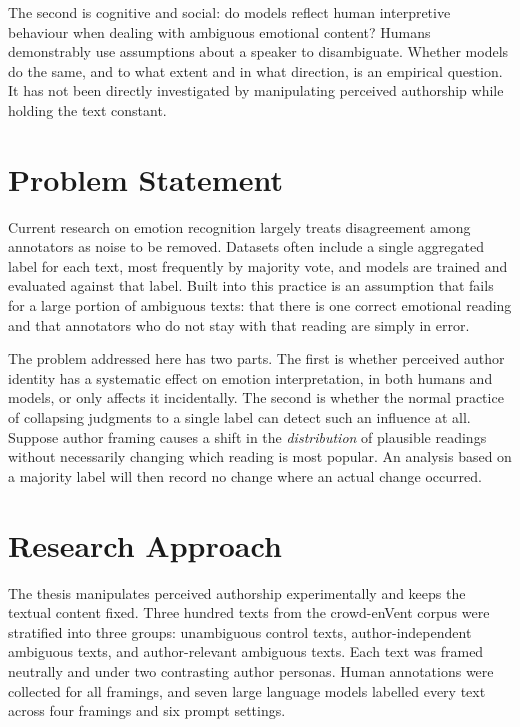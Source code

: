 The second is cognitive and social: do models reflect human interpretive behaviour when dealing
with ambiguous emotional content? Humans demonstrably use assumptions about a speaker to
disambiguate. Whether models do the same, and to what extent and in what direction, is an
empirical question. It has not been directly investigated by manipulating perceived authorship
while holding the text constant.

\section{Problem Statement}
\label{intro:problem}

\noindent
Current research on emotion recognition largely treats disagreement among annotators as
noise to be removed. Datasets often include a single aggregated label for each text, most
frequently by majority vote, and models are trained and evaluated against that label. Built into
this practice is an assumption that fails for a large portion of ambiguous texts: that there is
one correct emotional reading and that annotators who do not stay with that reading are simply
in error.

The problem addressed here has two parts. The first is whether perceived author identity has a
systematic effect on emotion interpretation, in both humans and models, or only affects it
incidentally. The second is whether the normal practice of collapsing judgments to a single label
can detect such an influence at all. Suppose author framing causes a shift in the
\emph{distribution} of plausible readings without necessarily changing which reading is most
popular. An analysis based on a majority label will then record no change where an actual change
occurred.

\section{Research Approach}
\label{intro:approach}

\noindent
The thesis manipulates perceived authorship experimentally and keeps the textual content fixed.
Three hundred texts from the crowd-enVent corpus \cite{Troiano2023CrowdEnVent} were stratified
into three groups: unambiguous control texts, author-independent ambiguous texts, and
author-relevant ambiguous texts. Each text was framed neutrally and under two contrasting author
personas. Human annotations were collected for all framings, and seven large language models
labelled every text across four framings and six prompt settings.

